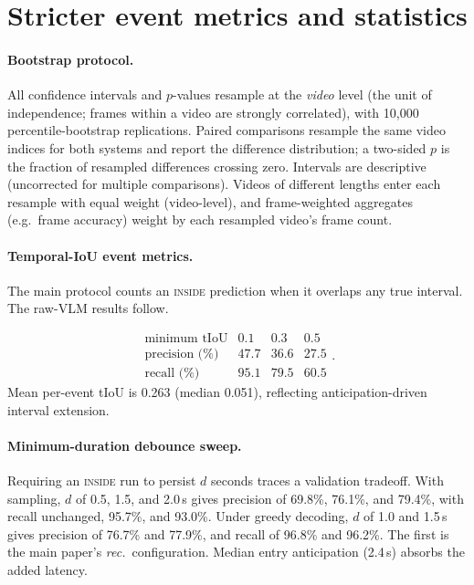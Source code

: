 \documentclass[10pt,twocolumn,letterpaper]{article}
\begin{document}
\section{Stricter event metrics and statistics}
\label{supp:stats}

\paragraph{Bootstrap protocol.}  All confidence intervals and $p$-values resample at the \emph{video} level (the unit of independence; frames within a video are strongly correlated), with 10{,}000 percentile-bootstrap replications.  Paired comparisons resample the same video indices for both systems and report the difference distribution; a two-sided $p$ is the fraction of resampled differences crossing zero.  Intervals are descriptive (uncorrected for multiple comparisons).  Videos of different lengths enter each resample with equal weight (video-level), and frame-weighted aggregates (e.g.\ frame accuracy) weight by each resampled video's frame count.

{\raggedright
\paragraph{Temporal-IoU event metrics.}  The main protocol counts an \textsc{inside} prediction when it overlaps any true interval.  The raw-VLM results follow.\par
}
\[
\begin{array}{c|ccc}
\text{minimum tIoU} & 0.1 & 0.3 & 0.5 \\\hline
\text{precision (\%)} & 47.7 & 36.6 & 27.5 \\
\text{recall (\%)} & 95.1 & 79.5 & 60.5
\end{array}.
\]
\noindent Mean per-event tIoU is 0.263 (median 0.051), reflecting anticipation-driven interval extension.

\paragraph{Minimum-duration debounce sweep.}  Requiring an \textsc{inside} run to persist $d$ seconds traces a validation tradeoff.  With sampling, $d$ of 0.5, 1.5, and 2.0\,s gives precision of 69.8\%, 76.1\%, and 79.4\%, with recall unchanged, 95.7\%, and 93.0\%.  Under greedy decoding, $d$ of 1.0 and 1.5\,s gives precision of 76.7\% and 77.9\%, and recall of 96.8\% and 96.2\%.  The first is the main paper's \emph{rec.}\ configuration.  Median entry anticipation (2.4\,s) absorbs the added latency.
\end{document}
